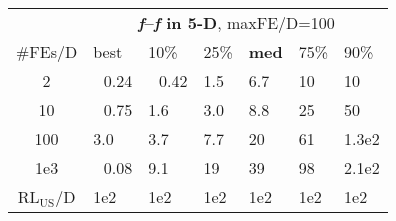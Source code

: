 \begin{tabular}{c|llllll}
 & \multicolumn{6}{|c}{\textbf{\textit{f}\raisebox{-0.35ex}{1}--\textit{f}\raisebox{-0.35ex}{24} in 5-D}, maxFE/D=100}\\
\#FEs/D & best & 10\% & 25\% & \textbf{med} & 75\% & 90\%\\
2 & ~\,0.24 & ~\,0.42 & \hspace*{1ex}1.5 & \hspace*{1ex}6.7 & 10 & 10\\
10 & ~\,0.75 & \hspace*{1ex}1.6 & \hspace*{1ex}3.0 & \hspace*{1ex}8.8 & 25 & 50\\
100 & \hspace*{1ex}3.0 & \hspace*{1ex}3.7 & \hspace*{1ex}7.7 & 20 & 61 & 1.3e2\\
1e3 & ~\,0.08 & \hspace*{1ex}9.1 & 19 & 39 & 98 & 2.1e2\\
$\text{RL}_{\text{US}}$/D & 1e2 & 1e2 & 1e2 & 1e2 & 1e2 & 1e2
\end{tabular}
